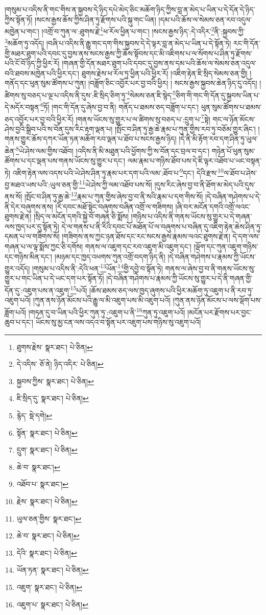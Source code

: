 །གསུམ་པ་འདིས་ནི་གང་གིས་ན་སྐྱབས་དེ་ཉིད་དཔེ་མེད་ཅིང་མཆོག་ཉིད་ཀྱིས་བླ་ན་མེད་པ་ཡིན་པ་དེ་དོན་དེ་ཉིད་ཀྱིས་སྟོན་ཏོ། །སངས་རྒྱས་ཆོས་ཀྱིས་ཤིན་ཏུ་རྫོགས་པའི་སྐུ་གང་ཡིན། །དམ་པའི་ཆོས་ལ་སེམས་ཅན་རབ་འདུལ་མཁྱེན་པ་གང་། །འགྲོ་བ་ཀུན་ལ་:ཐུགས་རྗེ་\footnote{ཐུགས་རྗེས་  སྣར་ཐང་།  པེ་ཅིན། }ཕ་རོལ་ཕྱིན་པ་གང་། །སངས་རྒྱས་ཉིད་:དེ་འདིར་\footnote{དེ་འདིས་  ཅོ་ནེ། ཉིད་འདིར་  པེ་ཅིན། }ནི་:སྐྱབས་ཀྱི་\footnote{སྐྱབས་ཀྱིས་  སྣར་ཐང་།  པེ་ཅིན། }མཆོག་ཏུ་འདོད། །བཞི་པ་འདིས་ནི་རྒྱུ་གང་དག་གིས་སྐྱབས་དེ་དེ་ལྟར་བླ་ན་མེད་པ་ཡིན་པ་དེ་སྟོན་ཏེ། རང་གི་དོན་གྱི་མཐར་ཐུག་པའི་དབང་དུ་བྱས་ནས་སངས་རྒྱས་ཀྱི་ཆོས་སྟོབས་དང་མི་འཇིགས་པ་ལ་སོགས་པ་ཤིན་ཏུ་རྫོགས་པའི་ངོ་བོ་ཉིད་ཀྱི་ཕྱིར་རོ། །གཞན་གྱི་དོན་མཐར་ཐུག་པའི་དབང་དུ་བྱས་ནས་དམ་པའི་ཆོས་ལ་སེམས་ཅན་འདུལ་བའི་ཐབས་མཁྱེན་པའི་ཕྱིར་དང་། ཐུགས་རྗེས་ཕ་རོལ་ཏུ་ཕྱིན་པའི་ཕྱིར་རོ། །འཇིག་རྟེན་ཇི་སྲིད་སེམས་ཅན་གྱི། །གནོད་དང་ཕུན་སུམ་ཚོགས་པ་ཀུན། །བཟློག་ཅིང་འབྱོར་པར་བྱ་བའི་ཕྱིར། །
སངས་རྒྱས་སྐྱབས་ཆེན་ཉིད་དུ་འདོད། །ཚིགས་སུ་བཅད་པ་ལྔ་པ་འདིས་ནི་དུས་:ཇི་སྲིད་ཅིག་ཏུ་\footnote{ཇི་སྲིད་དུ་  སྣར་ཐང་།  པེ་ཅིན། }སེམས་ཅན་ཇི་སྙེད་\footnote{རྙེད་  སྡེ་དགེ། }ཅིག་གི་གང་གི་དོན་དུ་སྐྱབས་ཡིན་པ་དེ་མདོར་བསྟན་\footnote{སྟོན་  སྣར་ཐང་།  པེ་ཅིན། }ཏོ། །གང་གི་དོན་དུ་ཞེས་བྱ་བ་ནི། གནོད་པ་ཐམས་ཅད་བཟློག་པ་དང་། ཕུན་སུམ་ཚོགས་པ་ཐམས་ཅད་འབྱོར་པར་བྱ་བའི་ཕྱིར་རོ། །གནས་ཡོངས་སུ་གྱུར་པ་ལ་ཚིགས་སུ་བཅད་པ་:དྲུག་པ་\footnote{དྲུག་  སྣར་ཐང་།  པེ་ཅིན། }སྟེ། གང་ལ་ཉོན་མོངས་ཤེས་བྱའི་སྒྲིབ་པའི་ས་བོན་དུས་རིང་རྟག་ལྡན་པ། །སྤོང་བ་ཤིན་ཏུ་རྒྱ་ཆེ་རྣམ་པ་ཀུན་གྱིས་རབ་ཏུ་བཅོམ་གྱུར་ཞིང་། །གནས་གྱུར་ཆོས་དཀར་ཡོན་ཏན་མཆོག་རབ་ལྡན་པ་ཐོབ་པ་སངས་རྒྱས་ཉིད། །དེ་ནི་མི་རྟོག་རབ་དག་ཤིན་ཏུ་ཡུལ་ཆེན་\footnote{ཆེ་བ་  སྣར་ཐང་། }ཡེ་ཤེས་ལམ་གྱིས་འཐོབ། །འདིས་ནི་མི་མཐུན་པའི་ཕྱོགས་ཀྱི་ས་བོན་དང་བྲལ་བ་དང་། གཉེན་པོ་ཕུན་སུམ་ཚོགས་པ་དང་ལྡན་པས་གནས་ཡོངས་སུ་གྱུར་པ་དང་། ལམ་རྣམ་པ་གཉིས་ཐོབ་པས་དེ་ཇི་ལྟར་འཐོབ་པ་ཡང་བསྟན་ཏེ། འཇིག་རྟེན་ལས་འདས་པའི་ཡེ་ཤེས་ཤིན་ཏུ་རྣམ་པར་དག་པའི་ལམ་:ཐོབ་པ་\footnote{འཐོབ་པ་  སྣར་ཐང་། }དང་། དེའི་རྫས་\footnote{རྗེས་  སྣར་ཐང་།  པེ་ཅིན། }ལ་ཐོབ་པ་ཤེས་བྱ་མཐའ་ཡས་པའི་:ཡུལ་ཅན་གྱི་\footnote{ཡུལ་ཅན་གྱིས་  སྣར་ཐང་། }ཡེ་ཤེས་ཀྱི་ལམ་འཐོབ་པས་སོ། །དུས་རིང་ཞེས་བྱ་བ་ནི་ཐོག་མ་མེད་པའི་དུས་ནས་སོ། །སྤོང་བ་ཤིན་ཏུ་རྒྱ་ཆེ་\footnote{ཆེ་བ་  སྣར་ཐང་།  པེ་ཅིན། }རྣམ་པ་ཀུན་གྱིས་ཞེས་བྱ་བ་ནི་སའི་རྣམ་པ་དག་གིས་སོ། །དེ་བཞིན་གཤེགས་པ་དེ་ནི་དེར་བཞུགས་ནས། །རི་དབང་མཐོ་སྟེང་བཞུགས་བཞིན་འགྲོ་ལ་གཟིགས། །ཞི་བར་མངོན་དགའི་འགྲོ་ལའང་ཐུགས་རྗེ་ན། །སྲིད་ལ་མངོན་དགའི་སྐྱེ་བོ་གཞན་ཅི་སྨོས། །གཉིས་པ་འདིས་ནི་གནས་ཡོངས་སུ་གྱུར་པ་དེ་གཞན་ལས་ཁྱད་པར་དུ་སྟོན་ཏེ། དེ་ལ་གནས་པ་ནི་རིའི་དབང་པོ་མཐོན་པོ་ལ་བཞུགས་པ་བཞིན་དུ་འཇིག་རྟེན་ཆེས་ཤིན་ཏུ་དམན་པ་ལ་གཟིགས་སོ། །གཟིགས་ནས་ཀྱང་ཉན་ཐོས་དང་རང་སངས་རྒྱས་རྣམས་ལའང་ཐུགས་རྗེ་ན། དེ་དག་ལས་གཞན་པ་ལ་ལྟ་སྨོས་ཀྱང་ཅི་དགོས། གནས་ལ་འཇུག་དང་རབ་འཇུག་མི་འཇུག་དང་། །ལྡོག་དང་ཀུན་འཇུག་གཉིས་དང་གཉིས་མིན་དང་། །མཉམ་དང་ཁྱད་འཕགས་ཀུན་འགྲོ་བདག་ཉིད་ནི། །དེ་བཞིན་གཤེགས་པ་རྣམས་ཀྱི་ཡོངས་གྱུར་འདོད། །གསུམ་པ་འདིས་ནི་:དེའི་ཕན་\footnote{དེའི་  སྣར་ཐང་།  པེ་ཅིན། }ཡོན་\footnote{ཡོན་ཏན་  སྣར་ཐང་།  པེ་ཅིན། }གྱི་དབྱེ་བ་སྟོན་ཏེ། གནས་ལ་ཞེས་བྱ་བ་ནི་གནས་ཡོངས་སུ་གྱུར་པ་གང་ཡིན་པ་དེ་ཡང་དག་པར་སྟོན་ཏོ། །དེ་བཞིན་གཤེགས་པ་རྣམས་ཀྱི་ཡོངས་སུ་གྱུར་པ་དེ་ནི་གཞན་གྱི་དོན་དུ་:འཇུག་པས་ན་འཇུག་\footnote{འཇུག་  སྣར་ཐང་།  པེ་ཅིན། }པའོ། །ཆོས་ཐམས་ཅད་ལས་ཁྱད་ཞུགས་པའི་ཕྱིར་མཆོག་ཏུ་འཇུག་པ་ནི་རབ་ཏུ་འཇུག་པའོ། །ཀུན་ནས་ཉོན་མོངས་པའི་རྒྱུ་ལ་མི་འཇུག་པས་མི་འཇུག་པའོ། །ཀུན་ནས་ཉོན་མོངས་པ་ལས་ལྡོག་པས་ཟློག་པའོ། །གཏན་དུ་བ་ཡིན་པའི་ཕྱིར་ཀུན་ཏུ་:འཇུག་པ་ནི་\footnote{འཇུག་པ་  སྣར་ཐང་།  པེ་ཅིན། }ཀུན་ཏུ་འཇུག་པའོ། །མངོན་པར་རྫོགས་པར་བྱང་ཆུབ་པ་དང་། ཡོངས་སུ་མྱ་ངན་ལས་འདའ་བ་སྟོན་པར་འཇུག་པས་གཉིས་སུ་འཇུག་པའོ། 